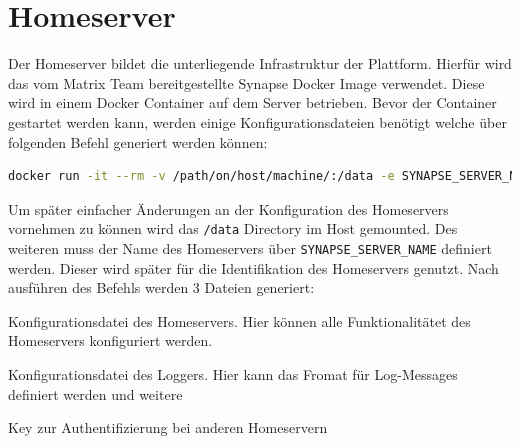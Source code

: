     \section{Homeserver}\label{sec:homeserver}
    Der Homeserver bildet die unterliegende Infrastruktur der Plattform.
    Hierfür wird das vom Matrix Team bereitgestellte Synapse Docker Image verwendet.
    Diese wird in einem Docker Container auf dem Server betrieben.
    Bevor der Container gestartet werden kann, werden einige Konfigurationsdateien benötigt welche über folgenden Befehl generiert werden können:
    \begin{lstlisting}[language=bash,label={lst:synapse-generate}]
docker run -it --rm -v /path/on/host/machine/:/data -e SYNAPSE_SERVER_NAME=my.matrix.host -e SYNAPSE_REPORT_STATS=yes matrixdotorg/synapse:latest generate
    \end{lstlisting}
    Um später einfacher Änderungen an der Konfiguration des Homeservers vornehmen zu können wird das \texttt{/data} Directory im Host gemounted.
    Des weiteren muss der Name des Homeservers über \texttt{SYNAPSE\_SERVER\_NAME} definiert werden.
    Dieser wird später für die Identifikation des Homeservers genutzt.
    Nach ausführen des Befehls werden 3 Dateien generiert:
    \begin{description}[leftmargin=!,labelwidth=4cm]
        \item [homeserver.yaml] Konfigurationsdatei des Homeservers. Hier können alle Funktionalitätet des Homeservers konfiguriert werden.
        \item [my.matrix.host.log.config] Konfigurationsdatei des Loggers. Hier kann das Fromat für Log-Messages definiert werden und weitere
        \item [my.matrix.host.signing.key] Key zur Authentifizierung bei anderen Homeservern
    \end{description}

